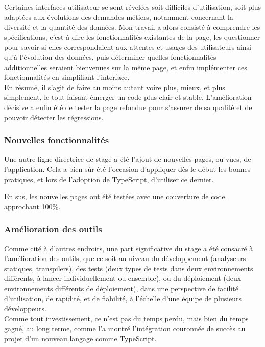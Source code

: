 \documentclass[a4paper,french,12pt]{article}
\begin{document}
		Certaines interfaces utilisateur se sont révelées soit difficiles d'utilisation, soit plus adaptées aux évolutions des demandes métiers, notamment concernant la diversité et la quantité des données. Mon travail a alors consisté à comprendre les spécifications, c'est-à-dire les fonctionnalités existantes de la page, les questionner pour savoir si elles correspondaient aux attentes et usages des utilisateurs ainsi qu'à l'évolution des données, puis déterminer quelles fonctionnalités additionnelles seraient bienvenues sur la même page,  et enfin implémenter ces fonctionnalités en simplifiant l'interface. ~\\
		En résumé, il s'agit de faire au moins autant voire plus, mieux, et plus simplement, le tout faisant émerger un code plus clair et stable.
		L'amélioration décisive a enfin été de tester la page refondue pour s'assurer de sa qualité et de pouvoir détecter les régressions.
		
		\subsubsection{Nouvelles fonctionnalités}
		
		Une autre ligne directrice de stage a été l'ajout de nouvelles pages, ou vues, de l'application. Cela a bien sûr été l'occasion d'appliquer dès le début les bonnes pratiques, et lors de l'adoption de TypeScript, d'utiliser ce dernier.
		
		En sus, les nouvelles pages ont été testées avec une couverture de code approchant 100\%.
		
		\subsubsection{Amélioration des outils}

		Comme cité à d'autres endroits, une part significative du stage a été consacré à l'amélioration des outils, que ce soit au niveau du développement (analyseurs statiques, transpilers), des tests (deux types de tests dans deux environnements différents, à lancer individuellement ou ensemble), ou du déploiement (deux environnements différents de déploiement), dans une perspective de facilité d'utilisation, de rapidité, et de fiabilité, à l'échelle d'une équipe de plusieurs développeurs.~\\	
		
Comme tout investissement, ce n'est pas du temps perdu, mais bien du temps gagné, au long terme, comme l'a montré l'intégration couronnée de succès au projet d'un nouveau langage comme TypeScript.~\\
\end{document}
